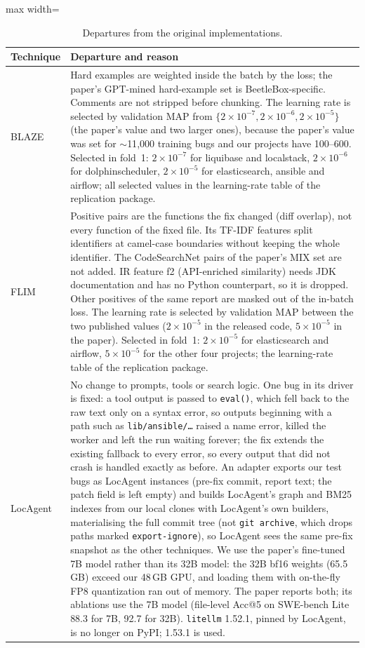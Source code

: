 \begin{table}[t]
\caption{Departures from the original implementations.}
\label{tab:deviations}
\small
\begin{adjustbox}{max width=\linewidth}\begin{tabular}{p{1.8cm}p{14.3cm}}
\toprule
Technique & Departure and reason \\
\midrule
BLAZE & Hard examples are weighted inside the batch by the loss; the paper's GPT-mined hard-example set is BeetleBox-specific. Comments are not stripped before chunking. The learning rate is selected by validation MAP from $\{2{\times}10^{-7}, 2{\times}10^{-6}, 2{\times}10^{-5}\}$ (the paper's value and two larger ones), because the paper's value was set for $\sim$11{,}000 training bugs and our projects have 100--600. Selected in fold~1: $2{\times}10^{-7}$ for liquibase and localstack, $2{\times}10^{-6}$ for dolphinscheduler, $2{\times}10^{-5}$ for elasticsearch, ansible and airflow; all selected values in the learning-rate table of the replication package. \\
FLIM & Positive pairs are the functions the fix changed (diff overlap), not every function of the fixed file. Its TF-IDF features split identifiers at camel-case boundaries without keeping the whole identifier. The CodeSearchNet pairs of the paper's MIX set are not added. IR feature f2 (API-enriched similarity) needs JDK documentation and has no Python counterpart, so it is dropped. Other positives of the same report are masked out of the in-batch loss. The learning rate is selected by validation MAP between the two published values ($2{\times}10^{-5}$ in the released code, $5{\times}10^{-5}$ in the paper). Selected in fold~1: $2{\times}10^{-5}$ for elasticsearch and airflow, $5{\times}10^{-5}$ for the other four projects; the learning-rate table of the replication package. \\
LocAgent & No change to prompts, tools or search logic. One bug in its driver is fixed: a tool output is passed to \texttt{eval()}, which fell back to the raw text only on a syntax error, so outputs beginning with a path such as \texttt{lib/ansible/\ldots} raised a name error, killed the worker and left the run waiting forever; the fix extends the existing fallback to every error, so every output that did not crash is handled exactly as before. An adapter exports our test bugs as LocAgent instances (pre-fix commit, report text; the patch field is left empty) and builds LocAgent's graph and BM25 indexes from our local clones with LocAgent's own builders, materialising the full commit tree (not \texttt{git archive}, which drops paths marked \texttt{export-ignore}), so LocAgent sees the same pre-fix snapshot as the other techniques. We use the paper's fine-tuned 7B model rather than its 32B model: the 32B bf16 weights (65.5\,GB) exceed our 48\,GB GPU, and loading them with on-the-fly FP8 quantization ran out of memory. The paper reports both; its ablations use the 7B model (file-level Acc@5 on SWE-bench Lite 88.3 for 7B, 92.7 for 32B). \texttt{litellm} 1.52.1, pinned by LocAgent, is no longer on PyPI; 1.53.1 is used. \\

\end{tabular}
\end{adjustbox}
\end{table}
